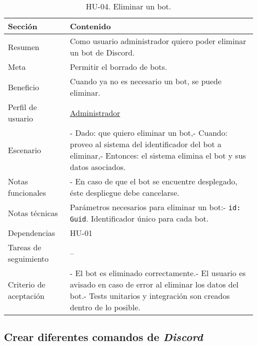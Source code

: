 \begin{table}[H]
    \centering
    \def\arraystretch{1.25}
    \begin{adjustbox}{max width=\textwidth}
    \begin{tabularx}{\textwidth}{l|L}
    \hline
        \textbf{Sección} & \textbf{Contenido} \\ \hline
    \hline
        Resumen & Como usuario administrador quiero poder eliminar un bot de Discord. \\ \hline
        Meta & Permitir el borrado de bots. \\ \hline
        Beneficio & Cuando ya no es necesario un bot, se puede eliminar. \\ \hline
        Perfil de usuario & \hyperref[sec:personaAdmin]{Administrador} \\ \hline
        Escenario & - Dado: que quiero eliminar un bot,\linebreak - Cuando: proveo al sistema del identificador del bot a eliminar,\linebreak - Entonces: el sistema elimina el bot y sus datos asociados. \\ \hline
        Notas funcionales & -  En caso de que el bot se encuentre desplegado, éste despliegue debe cancelarse. \\ \hline
        Notas técnicas & Parámetros necesarios para eliminar un bot:\linebreak - \verb|id: Guid|. Identificador único para cada bot. \\ \hline
        Dependencias & HU-01 \\ \hline
        Tareas de seguimiento & – \\ \hline
        Criterio de aceptación & - El bot es eliminado correctamente.\linebreak - El usuario es avisado en caso de error al eliminar los datos del bot.\linebreak - Tests unitarios y integración son creados dentro de lo posible. \\ \hline
    \end{tabularx}
    \end{adjustbox}
    \caption{HU-04. Eliminar un bot.}
\end{table}


\subsection{Crear diferentes comandos de \textit{Discord}}

